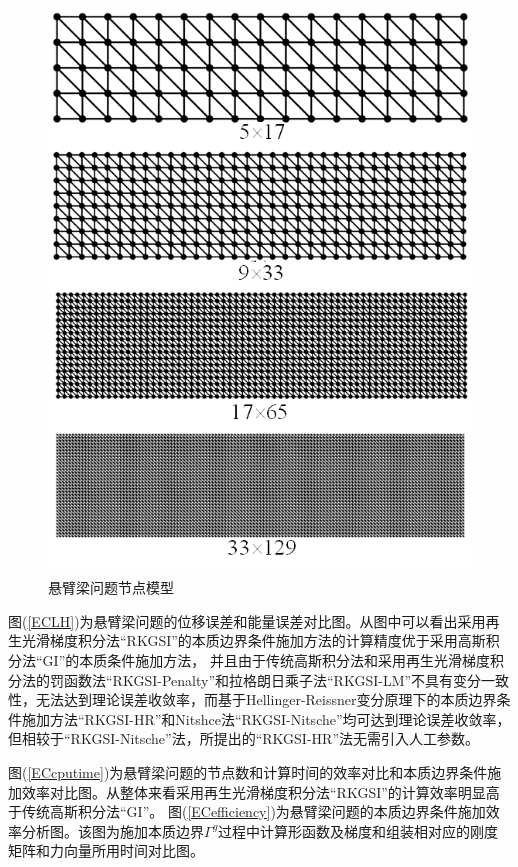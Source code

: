 \begin{figure}[H]
    \centering
    \includegraphics[scale=0.8]{figure/EHR/cantilever/cantilever.mesh.png}
    \caption{悬臂梁问题节点模型}\label{cantilever.mesh}
\end{figure}
图(\ref{ECLH})为悬臂梁问题的位移误差和能量误差对比图。从图中可以看出采用再生光滑梯度积分法“RKGSI”的本质边界条件施加方法的计算精度优于采用高斯积分法“GI”的本质条件施加方法，
并且由于传统高斯积分法和采用再生光滑梯度积分法的罚函数法“RKGSI-Penalty”和拉格朗日乘子法“RKGSI-LM”不具有变分一致性，无法达到理论误差收敛率，而基于Hellinger-Reissner变分原理下的本质边界条件施加方法“RKGSI-HR”和Nitshce法“RKGSI-Nitsche”均可达到理论误差收敛率，但相较于“RKGSI-Nitsche”法，所提出的“RKGSI-HR”法无需引入人工参数。
\par
图(\ref{ECcputime})为悬臂梁问题的节点数和计算时间的效率对比和本质边界条件施加效率对比图。从整体来看采用再生光滑梯度积分法“RKGSI”的计算效率明显高于传统高斯积分法“GI”。
图(\ref{ECefficiency})为悬臂梁问题的本质边界条件施加效率分析图。该图为施加本质边界$\Gamma^g$过程中计算形函数及梯度和组装相对应的刚度矩阵和力向量所用时间对比图。
